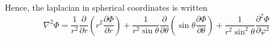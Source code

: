 Hence, the laplacian in spherical coordinates is written
\begin{equation}
\nabla^2 \Phi = \frac{1}{r^2}\frac{\partial}{\partial r} \left( r^2 \frac{\partial \Phi}{\partial r} \right) + \frac{1}{r^2 \sin \theta} \frac{\partial}{\partial \theta} \left( \sin \theta \frac{\partial \Phi}{\partial \theta} \right)+ \frac{1}{r^2 \sin^2 \theta} \frac{\partial ^2 \Phi}{\partial \varphi ^2} 
\end{equation}